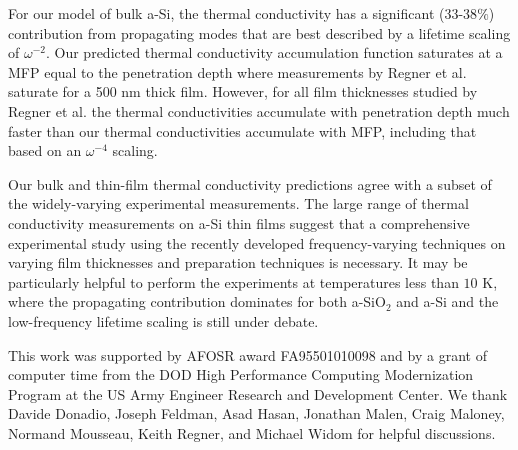 \documentclass[aps,prb,onecolumn,preprint,superscriptaddress,footinbib,amsmath,amssymb,floatfix]{revtex4}
\begin{document}
For our model of bulk a-Si, 
the thermal conductivity has a significant (33-38$\%$) 
contribution from propagating modes that are best 
described by a lifetime scaling of $\omega^{-2}$. Our predicted 
thermal conductivity accumulation function saturates at a MFP equal 
to the penetration depth where measurements by Regner et al. 
saturate for a 500 nm thick film. However, for all film thicknesses 
studied by Regner et al. the thermal conductivities accumulate with 
penetration depth much 
faster than our thermal conductivities accumulate with MFP, including 
that based on an $\omega^{-4}$ scaling. 

Our  
bulk and thin-film thermal conductivity predictions agree with 
a subset of the widely-varying experimental measurements. 
The large range of thermal conductivity measurements on 
a-Si thin films suggest that a comprehensive 
experimental study using the recently developed frequency-varying 
techniques\cite{koh_frequency_2007,minnich_thermal_2011,
regner_broadband_2013,regner_instrumentation_2013} 
on varying film thicknesses and preparation techniques is necessary.  
It may be particularly helpful to perform the experiments 
at temperatures less than $10$ K, where the propagating contribution 
dominates for both a-SiO$_2$ and a-Si and the low-frequency 
lifetime scaling is still under debate.
\cite{freeman_thermal_1986,cahill_lattice_1988,
cahill_thermal_1989,love_estimate_1990,feldman_thermal_1993,
cahill_thermal_1994,feldman_numerical_1999,baldi_thermal_2008,
liu_high_2009,yang_anomalously_2010} 


\begin{acknowledgements}
This work was supported by AFOSR award FA95501010098 and by a grant 
of computer time from the DOD 
High Performance Computing Modernization Program at the US Army 
Engineer 
Research and Development Center. 
We thank Davide Donadio, Joseph Feldman, Asad Hasan, Jonathan Malen,  
Craig Maloney, Normand Mousseau, Keith Regner, and Michael Widom 
for helpful discussions.
\end{acknowledgements}



\end{document}
